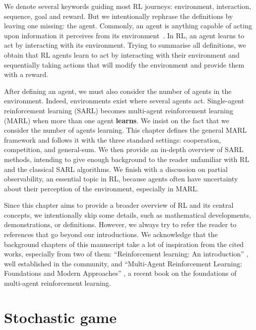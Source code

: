 We denote several keywords guiding most RL journeys: environment, interaction, sequence, goal and reward.
But we intentionally rephrase the definitions by leaving one missing: the agent.
Commonly, an agent is anything capable of acting upon information it perceives from its environment~\citep{russel2010}.
In RL, an agent learns to act by interacting with its environment. 
Trying to summarise all definitions, we obtain that RL agents learn to act by interacting with their environment and sequentially taking actions that will modify the environment and provide them with a reward.

After defining an agent, we must also consider the number of agents in the environment.
Indeed, environments exist where several agents act.
Single-agent reinforcement learning (SARL) becomes multi-agent reinforcement learning (MARL) when more than one agent \textbf{learns}.
We insist on the fact that we consider the number of agents learning.
This chapter defines the general MARL framework and follows it with the three standard settings: cooperation, competition, and general-sum.
We then provide an in-depth overview of SARL methods, intending to give enough background to the reader unfamiliar with RL and the classical SARL algorithms.
We finish with a discussion on partial observability, an essential topic in RL, because agents often have uncertainty about their perception of the environment, especially in MARL.

Since this chapter aims to provide a broader overview of RL and its central concepts, we intentionally skip some details, such as mathematical developments, demonstrations, or definitions.
However, we always try to refer the reader to references that go beyond our introductions.
We acknowledge that the background chapters of this manuscript take a lot of inspiration from the cited works, especially from two of them: ``Reinforcement learning: An introduction'' \citep{sutton2018reinforcement}, well established in the community, and ``Multi-Agent Reinforcement Learning: Foundations and Modern Approaches'' \citep{marl-book}, a recent book on the foundations of multi-agent reinforcement learning.

\section{Stochastic game}
\label{sec:ch2_stochastic_Game}

